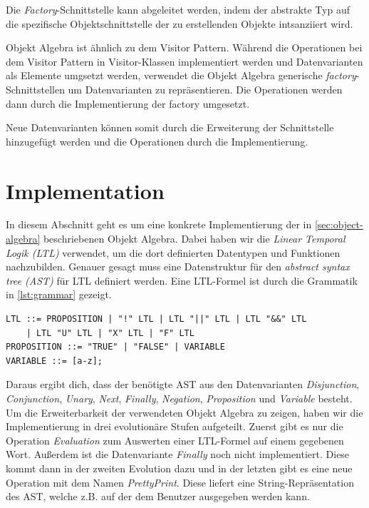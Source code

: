 \documentclass{llncs}
\begin{document}
Die \textit{Factory}-Schnittstelle kann abgeleitet werden, indem der abstrakte Typ auf die spezifische Objektschnittstelle der zu erstellenden Objekte intsanziiert wird.

Objekt Algebra ist ähnlich zu dem Visitor Pattern. Während die Operationen bei dem Visitor Pattern in Visitor-Klassen implementiert werden und Datenvarianten als Elemente umgsetzt werden, verwendet die Objekt Algebra generische \textit{factory}-Schnittstellen um Datenvarianten zu repräsentieren. Die Operationen werden dann durch die Implementierung der factory umgesetzt.

Neue Datenvarianten können somit durch die Erweiterung der Schnittstelle hinzugefügt werden und die Operationen durch die Implementierung.


\section{Implementation} \label{sec:implementation}
In diesem Abschnitt geht es um eine konkrete Implementierung der in \autoref{sec:object-algebra} beschriebenen Objekt Algebra.
Dabei haben wir die \emph{Linear Temporal Logik (LTL)} \cite{pnueli77} verwendet, um die dort definierten Datentypen und Funktionen nachzubilden.
Genauer gesagt muss eine Datenstruktur für den \emph{abstract syntax tree (AST)} für LTL definiert werden.
Eine LTL-Formel ist durch die Grammatik in \autoref{lst:grammar} gezeigt.

\begin{lstlisting}
LTL ::= PROPOSITION | "!" LTL | LTL "||" LTL | LTL "&&" LTL
	| LTL "U" LTL | "X" LTL | "F" LTL
PROPOSITION ::= "TRUE" | "FALSE" | VARIABLE
VARIABLE ::= [a-z];
\end{lstlisting}\label{lst:grammar}

Daraus ergibt dich, dass der benötigte AST aus den Datenvarianten \emph{Disjunction}, \emph{Conjunction}, \emph{Unary}, \emph{Next}, \emph{Finally}, \emph{Negation}, \emph{Proposition} und \emph{Variable} besteht.
Um die Erweiterbarkeit der verwendeten Objekt Algebra zu zeigen, haben wir die Implementierung in drei evolutionäre Stufen aufgeteilt.
Zuerst gibt es nur die Operation \emph{Evaluation} zum Auswerten einer LTL-Formel auf einem gegebenen Wort. Außerdem ist die Datenvariante \emph{Finally} noch nicht implementiert.
Diese kommt dann in der zweiten Evolution dazu und in der letzten gibt es eine neue Operation mit dem Namen \emph{PrettyPrint}.
Diese liefert eine String-Repräsentation des AST, welche z.B. auf der dem Benutzer ausgegeben werden kann.
\end{document}
